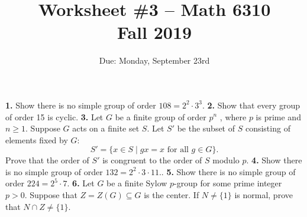 \documentclass[11pt]{amsart}
\theoremstyle{theorem}
\begin{document}
\title{Worksheet \#3 -- Math 6310\\Fall 2019}
\author{Due: Monday, September 23rd}
\maketitle

{\bf 1.}   Show there is no simple group of order $108 = 2^2 \cdot 3^3$.
\newpage
\noindent
{\bf 2.}  Show that every group of order 15 is cyclic.  
\newpage
\noindent
{\bf 3.}   Let $G$ be a finite group of order $p^n$ , where $p$ is prime and $n \geq 1$. Suppose $G$
acts on a finite set $S$. Let $S'$ be the subset of $S$ consisting of elements fixed
by $G$:
\[
S' = \{ x\in S \;|\; gx = x \text{ for all $g \in G$} \}.
\]
Prove that the order of $S'$ is congruent to the order of $S$ modulo $p$.
\newpage
\noindent
{\bf 4.}  Show there is no simple group of order $132 = 2^2 \cdot 3 \cdot 11$..
\newpage
\noindent
{\bf 5.}  Show there is no simple group of order $224 = 2^5 \cdot 7$.
\newpage
\noindent
{\bf 6.}  Let $G$ be a finite Sylow $p$-group for some prime integer $p > 0$.  Suppose that $Z = Z(G) \subseteq G$ is the center.  If $N \neq \{ 1 \}$ is normal, prove that $N \cap Z \neq \{ 1 \}$.
\end{document}
